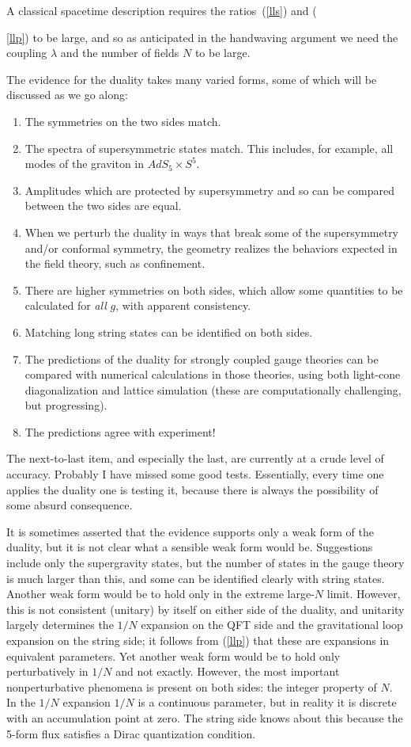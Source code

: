 \documentclass[12pt]{article}
\begin{document}
A classical spacetime description requires the ratios~(\ref{lls}) and ({\ref{llp}) to be large, and so as anticipated in the handwaving argument we need the coupling $\lambda$ and the number of fields $N$ to be large.

The evidence for the duality takes many varied forms, some of which will be discussed as we go along:
\begin{enumerate}
\item The symmetries on the two sides match.
\item The spectra of supersymmetric states match.  This includes, for example, all modes of the graviton in $AdS_5 \times S^5$.
\item Amplitudes which are protected by supersymmetry and so can be compared between the two sides are equal.
\item When we perturb the duality in ways that break some of the supersymmetry and/or conformal symmetry, the geometry realizes the behaviors expected in the field theory, such as confinement.
\item There are higher symmetries on both sides, which allow some quantities to be calculated for {\it all} $g$, with apparent consistency.
\item Matching long string states can be identified on both sides.
\item The predictions of the duality for strongly coupled gauge theories can be compared with numerical calculations in those theories, using both light-cone diagonalization and lattice simulation (these are computationally challenging, but progressing).
\item The predictions agree with experiment!
\end{enumerate}
The next-to-last item, and especially the last, are currently at a crude level of accuracy.  Probably I have missed some good tests.  Essentially, every time one applies the duality one is testing it, because there is always the possibility of some absurd consequence.

It is sometimes asserted that the evidence supports only a weak form of the duality, but it is not clear what a sensible weak form would be.  Suggestions include only the supergravity states, but the number of states in the gauge theory is much larger than this, and some can be identified clearly with string states.  Another weak form would be to hold only in the extreme large-$N$ limit.  However, this is not consistent (unitary) by itself on either side of the duality, and unitarity largely determines the $1/N$ expansion on the QFT side and the gravitational loop expansion on the string side; it follows from (\ref{llp}) that these are expansions in equivalent parameters.  Yet another weak form would be to hold only perturbatively in $1/N$ and not exactly.  However, the most important nonperturbative phenomena is present on both sides: the integer property of $N$.  In the $1/N$ expansion $1/N$ is a continuous parameter, but in reality it is discrete with an accumulation point at zero.  The string side knows about this because the 5-form flux satisfies a Dirac quantization condition.  

}
\end{document}
